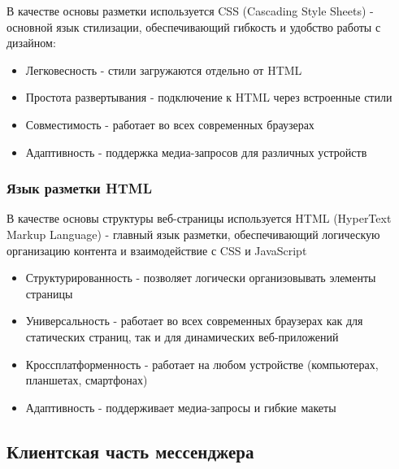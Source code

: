 В качестве основы разметки используется CSS (Cascading Style Sheets) - основной язык стилизации, обеспечивающий гибкость и удобство работы с дизайном:
\begin{itemize}
	\item Легковесность - стили загружаются отдельно от HTML
	\item Простота развертывания - подключение к HTML через встроенные стили
	\item Совместимость - работает во всех современных браузерах
	\item Адаптивность - поддержка медиа-запросов для различных устройств
\end{itemize}

\subsubsection{Язык разметки HTML}

В качестве основы структуры веб-страницы используется HTML (HyperText Markup Language) - главный язык разметки, обеспечивающий логическую организацию контента и взаимодействие с CSS и JavaScript
\begin{itemize}
	\item Структурированность - позволяет логически организовывать элементы страницы
	\item Универсальность - работает во всех современных браузерах как для статических страниц, так и для динамических веб-приложений
	\item Кроссплатформенность - работает на любом устройстве (компьютерах, планшетах, смартфонах)
	\item Адаптивность - поддерживает медиа-запросы и гибкие макеты
\end{itemize}


\subsection{Клиентская часть мессенджера}



